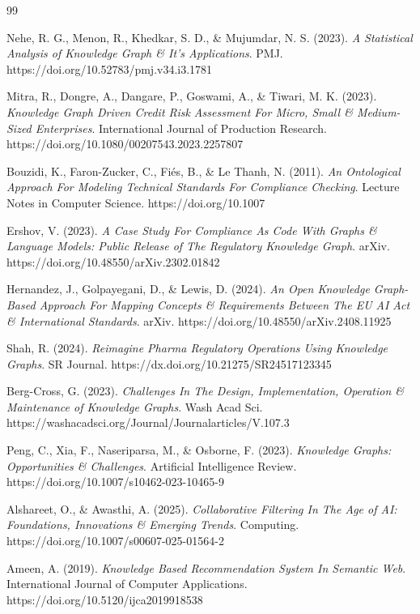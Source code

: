 \begin{thebibliography}{99}

Nehe, R. G., Menon, R., Khedkar, S. D., \& Mujumdar, N. S. (2023). 
\textit{A Statistical Analysis of Knowledge Graph \& It’s Applications}. 
PMJ. https://doi.org/10.52783/pmj.v34.i3.1781

Mitra, R., Dongre, A., Dangare, P., Goswami, A., \& Tiwari, M. K. (2023). 
\textit{Knowledge Graph Driven Credit Risk Assessment For Micro, Small \& Medium-Sized Enterprises}. 
International Journal of Production Research. https://doi.org/10.1080/00207543.2023.2257807

Bouzidi, K., Faron-Zucker, C., Fi{\'e}s, B., \& Le Thanh, N. (2011). 
\textit{An Ontological Approach For Modeling Technical Standards For Compliance Checking}. 
Lecture Notes in Computer Science. https://doi.org/10.1007

Ershov, V. (2023). 
\textit{A Case Study For Compliance As Code With Graphs \& Language Models: Public Release of The Regulatory Knowledge Graph}. 
arXiv. https://doi.org/10.48550/arXiv.2302.01842

Hernandez, J., Golpayegani, D., \& Lewis, D. (2024). 
\textit{An Open Knowledge Graph-Based Approach For Mapping Concepts \& Requirements Between The EU AI Act \& International Standards}. 
arXiv. https://doi.org/10.48550/arXiv.2408.11925

Shah, R. (2024). 
\textit{Reimagine Pharma Regulatory Operations Using Knowledge Graphs}. 
SR Journal. https://dx.doi.org/10.21275/SR24517123345

Berg-Cross, G. (2023). 
\textit{Challenges In The Design, Implementation, Operation \& Maintenance of Knowledge Graphs}. 
Wash Acad Sci. https://washacadsci.org/Journal/Journalarticles/V.107.3

Peng, C., Xia, F., Naseriparsa, M., \& Osborne, F. (2023). 
\textit{Knowledge Graphs: Opportunities \& Challenges}. 
Artificial Intelligence Review. https://doi.org/10.1007/s10462-023-10465-9

Alshareet, O., \& Awasthi, A. (2025). 
\textit{Collaborative Filtering In The Age of AI: Foundations, Innovations \& Emerging Trends}. 
Computing. https://doi.org/10.1007/s00607-025-01564-2

Ameen, A. (2019). 
\textit{Knowledge Based Recommendation System In Semantic Web}. 
International Journal of Computer Applications. https://doi.org/10.5120/ijca2019918538


\end{thebibliography}
